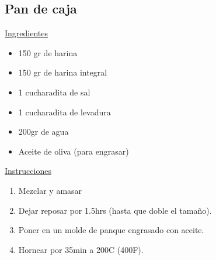 \subsection{Pan de caja}

\underline{Ingredientes}

\begin{itemize}
\item 150 gr de harina
\item 150 gr de harina integral
\item 1 cucharadita de sal
\item 1 cucharadita de levadura
\item 200gr de agua
\item Aceite de oliva (para engrasar)
\end{itemize}

\underline{Instrucciones}

\begin{enumerate}
\item Mezclar y amasar
\item Dejar reposar por \Sim1.5hrs (hasta que doble el tamaño).
\item Poner en un molde de panque engrasado con aceite.
\item Hornear por \Sim35min a 200C (400F).
\end{enumerate}
